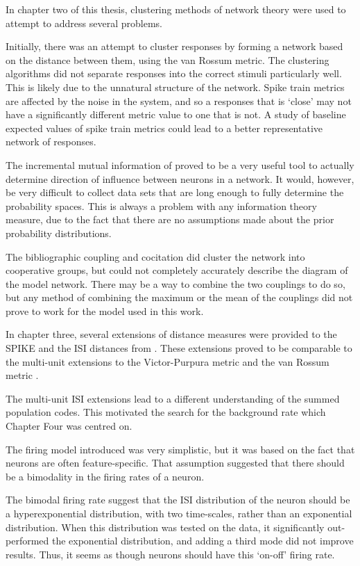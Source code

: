 In chapter two of this thesis, clustering methods of network theory were used to attempt to address several problems.  

Initially, there was an attempt to cluster responses by forming a network based on the distance between them, using the van Rossum metric. The clustering algorithms did not separate responses into the correct stimuli particularly well.  This is likely due to the unnatural structure of the network.  Spike train metrics are affected by the noise in the system, and so a responses that is \lq{}close\rq{} may not have a significantly different metric value to one that is not.  A study of baseline expected values of spike train metrics could lead to a better representative network of responses.

The incremental mutual information of \citep{SinghLesica2010a} proved to be a very useful tool to actually determine direction of influence between neurons in a network.  It would, however, be very difficult to collect data sets that are long enough to fully determine the probability spaces.  This is always a problem with any information theory measure, due to the fact that there are no assumptions made about the prior probability distributions.

The bibliographic coupling and cocitation did cluster the network into cooperative groups, but could not completely accurately describe the diagram of the model network.  There may be a way to combine the two couplings to do so, but any method of combining the maximum or the mean of the couplings did not prove to work for the model used in this work. 

In chapter three, several extensions of distance measures were provided to the SPIKE and the ISI distances from \citep{KreuzEtAl2007a,KreuzEtAl2012a}. These extensions proved to be comparable to the multi-unit extensions to the Victor-Purpura metric \citep{AronovEtAl2008a} and the van Rossum metric \citep{HoughtonSen2008a}.

The multi-unit ISI extensions lead to a different understanding of the summed population codes.  This motivated the search for the background rate which Chapter Four was centred on.

The firing model introduced was very simplistic, but it was based on the fact that neurons are often feature-specific.  That assumption suggested that there should be a bimodality in the firing rates of a neuron.

The bimodal firing rate suggest that the ISI distribution of the neuron should be a hyperexponential distribution, with two time-scales, rather than an exponential distribution.  When this distribution was tested on the data, it significantly out-performed the exponential distribution, and adding a third mode did not improve results.  Thus, it seems as though neurons should have this \lq{}on-off\rq{} firing rate.

